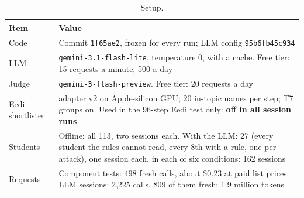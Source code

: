 \documentclass[11pt,a4paper]{article}
\newcommand{\code}[1]{\texttt{#1}}
\begin{document}
\begin{table}[H]
\centering\small
\begin{tabularx}{\linewidth}{@{}P{3.2cm}Y@{}}
\toprule
Item & Value \\
\midrule
Code & Commit \code{1f65ae2}, frozen for every run; LLM config \code{95b6fb45c934} \\
LLM & \code{gemini-3.1-flash-lite}, temperature 0, with a cache. Free tier: 15 requests a minute, 500 a day \\
Judge & \code{gemini-3-flash-preview}. Free tier: 20 requests a day \\
Eedi shortlister & adapter v2 on Apple-silicon GPU; 20 in-topic names per step; T7 groups on. Used in the 96-step Eedi test only: \textbf{off in all session runs} \\
Students & Offline: all 113, two sessions each. With the LLM: 27 (every student the rules cannot read, every 8th with a rule, one per attack), one session each, in each of six conditions: 162 sessions \\
Requests & Component tests: 498 fresh calls, about \$0.23 at paid list prices. LLM sessions: 2,225 calls, 809 of them fresh; 1.9 million tokens \\
\bottomrule
\end{tabularx}
\caption{Setup.}
\end{table}
\end{document}
